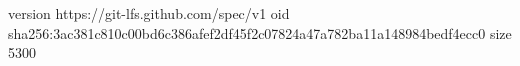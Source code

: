 version https://git-lfs.github.com/spec/v1
oid sha256:3ac381c810c00bd6c386afef2df45f2c07824a47a782ba11a148984bedf4ecc0
size 5300
